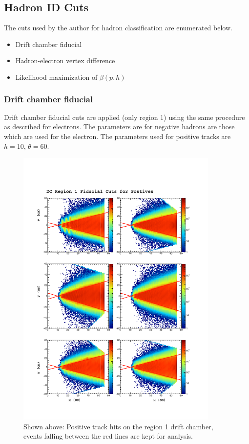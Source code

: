 \subsection{Hadron ID Cuts}

The cuts used by the author for hadron classification are enumerated below.

\begin{itemize}
  \item{Drift chamber fiducial}
  \item{Hadron-electron vertex difference}
  \item{Likelihood maximization of $\beta(p,h)$}
\end{itemize}


\subsubsection*{Drift chamber fiducial}
Drift chamber fiducial cuts are applied (only region 1) using the same procedure as described for electrons.  The parameters are for negative hadrons are those which are used for the electron.  The parameters used for positive tracks are $h = 10$, $\theta = 60$.

\begin{figure}
  \label{fig:fid}
  \begin{center}
    \includegraphics[width=10cm]{image/plots/hadron-id/fid.pdf}
    \caption{Shown above: Positive track hits on the region 1 drift chamber, events falling between the red lines are kept for analysis.}
  \end{center}
\end{figure}

